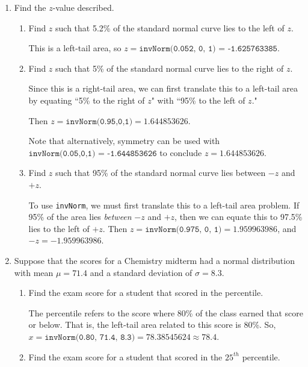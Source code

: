 \documentclass[11pt]{article}
\newcommand{\answer}[1]{\color{white}#1}
\begin{document}
\begin{enumerate}
\item Find the $z$-value described.

	\begin{enumerate}
	
	\item Find $z$ such that 5.2\% of the standard normal curve lies to the left of $z$.  
	
	{\answer This is a left-tail area, so $z = \texttt{invNorm(0.052, 0, 1) = -1.625763385}$.
	} 

	\item Find $z$ such that 5\% of the standard normal curve lies to the right of $z$.  
	
	{\answer Since this is a right-tail area, we can first translate this to a left-tail area by equating ``5\% to the right of $z$" with ``95\% to the left of $z$."  
	
	Then $z = \texttt{invNorm(0.95,0,1)} = 1.644853626$. 
	
	Note that alternatively, symmetry can be used with  $\texttt{invNorm(0.05,0,1) = -1.644853626}$ to conclude $z=1.644853626$.
	} 

	\item Find $z$ such that 95\% of the standard normal curve lies between $-z$ and $+z$. 
	
	{\answer To use \texttt{invNorm}, we must first translate this to a left-tail area problem.  If 95\% of the area lies {\em between} $-z$ and $+z$, then we can equate this to 97.5\% lies to the left of $+z$.  
	Then $z = \texttt{invNorm(0.975, 0, 1)} = 1.959963986$, and $-z = -1.959963986$.
	} 
	
	\end{enumerate}
	
\item Suppose that the scores for a Chemistry midterm had a normal distribution with mean $\mu = 71.4$ and a standard deviation of $\sigma = 8.3$.

	\begin{enumerate}
	
	\item Find the exam score for a student that scored in the  percentile. 
	
	{\answer The  percentile refers to the score where 80\% of the class earned that score or below.  That is, the left-tail area related to this score is 80\%. So, $x = \texttt{invNorm(0.80, 71.4, 8.3)} = 78.38545624 \approx 78.4$.
	} 
	
	\item Find the exam score for a student that scored in the $25^{th}$ percentile. 
	

\end{enumerate}
\end{enumerate}
\end{document}
